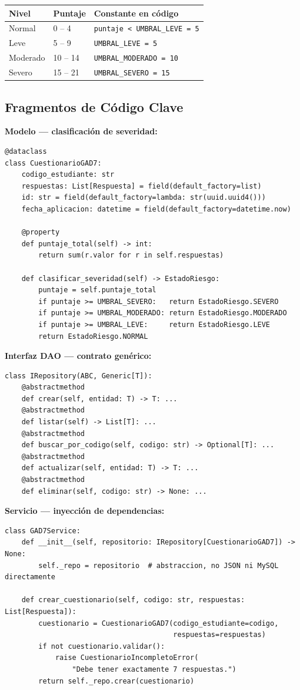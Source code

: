 \documentclass[12pt, a4paper]{article}
\begin{document}
\vspace{0.5em}
\begin{tabular}{L{4cm} L{4cm} L{6cm}}
  \toprule
  \textbf{Nivel} & \textbf{Puntaje} & \textbf{Constante en código} \\
  \midrule
  Normal   & 0 -- 4  & \texttt{puntaje < UMBRAL\_LEVE = 5} \\[4pt]
  Leve     & 5 -- 9  & \texttt{UMBRAL\_LEVE = 5} \\[4pt]
  Moderado & 10 -- 14 & \texttt{UMBRAL\_MODERADO = 10} \\[4pt]
  Severo   & 15 -- 21 & \texttt{UMBRAL\_SEVERO = 15} \\
  \bottomrule
\end{tabular}

\newpage
\subsection{Fragmentos de Código Clave}

\textbf{Modelo — clasificación de severidad:}
\begin{lstlisting}
@dataclass
class CuestionarioGAD7:
    codigo_estudiante: str
    respuestas: List[Respuesta] = field(default_factory=list)
    id: str = field(default_factory=lambda: str(uuid.uuid4()))
    fecha_aplicacion: datetime = field(default_factory=datetime.now)

    @property
    def puntaje_total(self) -> int:
        return sum(r.valor for r in self.respuestas)

    def clasificar_severidad(self) -> EstadoRiesgo:
        puntaje = self.puntaje_total
        if puntaje >= UMBRAL_SEVERO:   return EstadoRiesgo.SEVERO
        if puntaje >= UMBRAL_MODERADO: return EstadoRiesgo.MODERADO
        if puntaje >= UMBRAL_LEVE:     return EstadoRiesgo.LEVE
        return EstadoRiesgo.NORMAL
\end{lstlisting}

\textbf{Interfaz DAO — contrato genérico:}
\begin{lstlisting}
class IRepository(ABC, Generic[T]):
    @abstractmethod
    def crear(self, entidad: T) -> T: ...
    @abstractmethod
    def listar(self) -> List[T]: ...
    @abstractmethod
    def buscar_por_codigo(self, codigo: str) -> Optional[T]: ...
    @abstractmethod
    def actualizar(self, entidad: T) -> T: ...
    @abstractmethod
    def eliminar(self, codigo: str) -> None: ...
\end{lstlisting}

\textbf{Servicio — inyección de dependencias:}
\begin{lstlisting}
class GAD7Service:
    def __init__(self, repositorio: IRepository[CuestionarioGAD7]) -> None:
        self._repo = repositorio  # abstraccion, no JSON ni MySQL directamente

    def crear_cuestionario(self, codigo: str, respuestas: List[Respuesta]):
        cuestionario = CuestionarioGAD7(codigo_estudiante=codigo,
                                        respuestas=respuestas)
        if not cuestionario.validar():
            raise CuestionarioIncompletoError(
                "Debe tener exactamente 7 respuestas.")
        return self._repo.crear(cuestionario)
\end{lstlisting}
\end{document}

